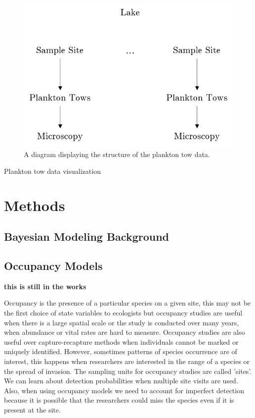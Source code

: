 \documentclass[12pt]{article}\usepackage[]{graphicx}\usepackage[]{color}
\begin{document}
\begin{figure}[h]
	\centering
	\includegraphics[scale = 0.7]{planktontow}
	\caption{A diagram displaying the structure of the plankton tow data.}
	\label{pt}
\end{figure}

Plankton tow data visualization

\section{Methods}

\subsection{Bayesian Modeling Background}

\subsection{Occupancy Models}

\textbf{this is still in the works}

Occupancy is the presence of a particular species on a given site, this may not be the first choice of state variables to ecologists but occupancy studies are useful when there is a large spatial scale or the study is conducted over many years, when abundance or vital rates are hard to measure. Occupancy studies are also useful over capture-recapture methods when individuals cannot be marked or uniquely identified. However, sometimes patterns of species occurrence are of interest, this happens when researchers are interested in the range of a species or the spread of invasion. The sampling units for occupancy studies are called 'sites'. We can learn about detection probabilities when multiple site visits are used. Also, when using occupancy models we need to account for imperfect detection because it is possible that the researchers could miss the species even if it is present at the site. 
\end{document}
